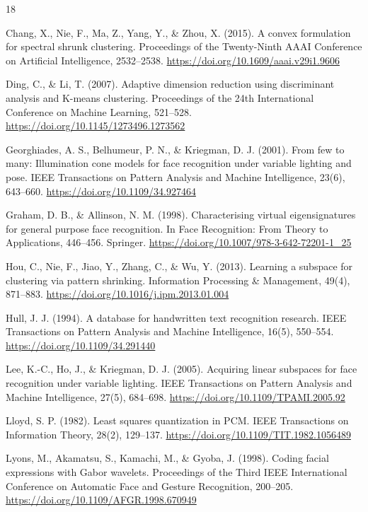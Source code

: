 \documentclass{article}
\begin{document}
\begin{thebibliography}{18}

Chang, X., Nie, F., Ma, Z., Yang, Y., \& Zhou, X. (2015).
A convex formulation for spectral shrunk clustering.
Proceedings of the Twenty-Ninth AAAI Conference on Artificial Intelligence, 2532--2538.
\url{https://doi.org/10.1609/aaai.v29i1.9606}

Ding, C., \& Li, T. (2007).
Adaptive dimension reduction using discriminant analysis and K-means clustering.
Proceedings of the 24th International Conference on Machine Learning, 521--528.
\url{https://doi.org/10.1145/1273496.1273562}

Georghiades, A. S., Belhumeur, P. N., \& Kriegman, D. J. (2001).
From few to many: Illumination cone models for face recognition under variable lighting and pose.
IEEE Transactions on Pattern Analysis and Machine Intelligence, 23(6), 643--660.
\url{https://doi.org/10.1109/34.927464}

Graham, D. B., \& Allinson, N. M. (1998).
Characterising virtual eigensignatures for general purpose face recognition.
In Face Recognition: From Theory to Applications, 446--456. Springer.
\url{https://doi.org/10.1007/978-3-642-72201-1_25}

Hou, C., Nie, F., Jiao, Y., Zhang, C., \& Wu, Y. (2013).
Learning a subspace for clustering via pattern shrinking.
Information Processing \& Management, 49(4), 871--883.
\url{https://doi.org/10.1016/j.ipm.2013.01.004}

Hull, J. J. (1994).
A database for handwritten text recognition research.
IEEE Transactions on Pattern Analysis and Machine Intelligence, 16(5), 550--554.
\url{https://doi.org/10.1109/34.291440}

Lee, K.-C., Ho, J., \& Kriegman, D. J. (2005).
Acquiring linear subspaces for face recognition under variable lighting.
IEEE Transactions on Pattern Analysis and Machine Intelligence, 27(5), 684--698.
\url{https://doi.org/10.1109/TPAMI.2005.92}

Lloyd, S. P. (1982).
Least squares quantization in PCM.
IEEE Transactions on Information Theory, 28(2), 129--137.
\url{https://doi.org/10.1109/TIT.1982.1056489}

Lyons, M., Akamatsu, S., Kamachi, M., \& Gyoba, J. (1998).
Coding facial expressions with Gabor wavelets.
Proceedings of the Third IEEE International Conference on Automatic Face and Gesture Recognition, 200--205.
\url{https://doi.org/10.1109/AFGR.1998.670949}


\end{thebibliography}
\end{document}
